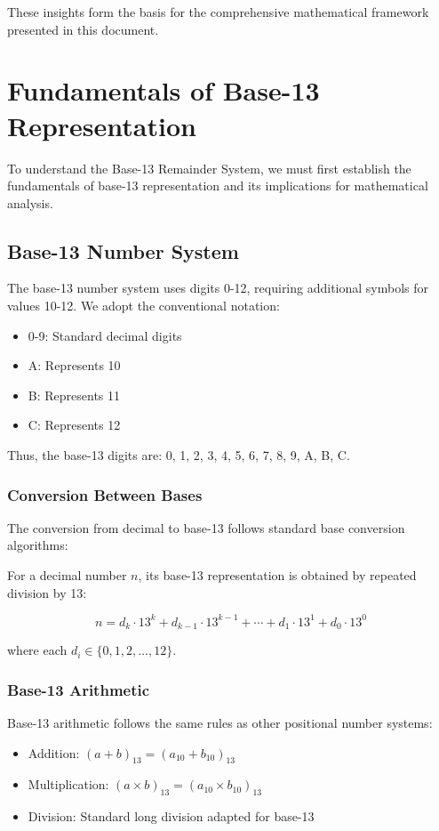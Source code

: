 \documentclass[12pt,a4paper]{report}
\begin{document}
These insights form the basis for the comprehensive mathematical framework presented in this document.

\chapter{Fundamentals of Base-13 Representation}

To understand the Base-13 Remainder System, we must first establish the fundamentals of base-13 representation and its implications for mathematical analysis.

\section{Base-13 Number System}

The base-13 number system uses digits 0-12, requiring additional symbols for values 10-12. We adopt the conventional notation:

\begin{itemize}
\item 0-9: Standard decimal digits
\item A: Represents 10
\item B: Represents 11
\item C: Represents 12
\end{itemize}

Thus, the base-13 digits are: 0, 1, 2, 3, 4, 5, 6, 7, 8, 9, A, B, C.

\subsection{Conversion Between Bases}

The conversion from decimal to base-13 follows standard base conversion algorithms:

For a decimal number $n$, its base-13 representation is obtained by repeated division by 13:

\[
n = d_k \cdot 13^k + d_{k-1} \cdot 13^{k-1} + \cdots + d_1 \cdot 13^1 + d_0 \cdot 13^0
\]

where each $d_i \in \{0, 1, 2, \ldots, 12\}$.

\subsection{Base-13 Arithmetic}

Base-13 arithmetic follows the same rules as other positional number systems:

\begin{itemize}
\item Addition: $(a + b)_{13} = (a_{10} + b_{10})_{13}$
\item Multiplication: $(a \times b)_{13} = (a_{10} \times b_{10})_{13}$
\item Division: Standard long division adapted for base-13
\end{itemize}
\end{document}
